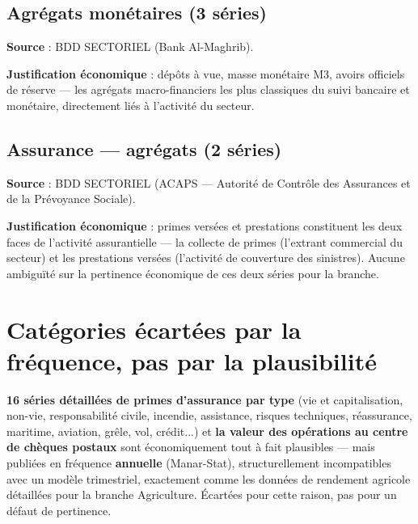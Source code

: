 \documentclass[11pt,a4paper]{article}
\begin{document}
\subsection{Agrégats monétaires (3 séries)}

\textbf{Source} : BDD SECTORIEL (Bank Al-Maghrib).

\textbf{Justification économique} : dépôts à vue, masse monétaire M3, avoirs officiels de réserve --- les agrégats macro-financiers les plus classiques du suivi bancaire et monétaire, directement liés à l'activité du secteur.

\subsection{Assurance --- agrégats (2 séries)}

\textbf{Source} : BDD SECTORIEL (ACAPS --- Autorité de Contrôle des Assurances et de la Prévoyance Sociale).

\textbf{Justification économique} : primes versées et prestations constituent les deux faces de l'activité assurantielle --- la collecte de primes (l'extrant commercial du secteur) et les prestations versées (l'activité de couverture des sinistres). Aucune ambiguïté sur la pertinence économique de ces deux séries pour la branche.

\section{Catégories écartées par la fréquence, pas par la plausibilité}

\begin{noteboxbleu}
\textbf{16 séries détaillées de primes d'assurance par type} (vie et capitalisation, non-vie, responsabilité civile, incendie, assistance, risques techniques, réassurance, maritime, aviation, grêle, vol, crédit...) et \textbf{la valeur des opérations au centre de chèques postaux} sont économiquement tout à fait plausibles --- mais publiées en fréquence \textbf{annuelle} (Manar-Stat), structurellement incompatibles avec un modèle trimestriel, exactement comme les données de rendement agricole détaillées pour la branche Agriculture. Écartées pour cette raison, pas pour un défaut de pertinence.
\end{noteboxbleu}

\end{document}
